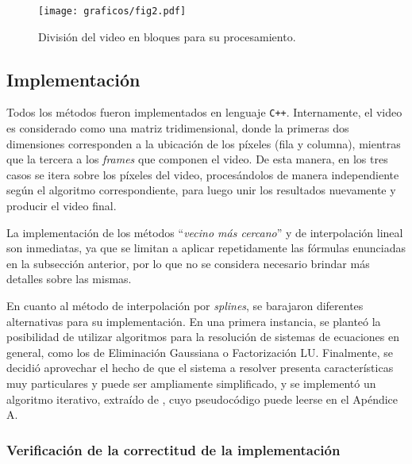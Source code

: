         \begin{figure}[h]
          \centering

          \texttt{[image: graficos/fig2.pdf]} \vspace{1em} \\

          \caption{División del video en bloques para su procesamiento.}
          \label{fig:spline-bloques}
        \end{figure}


  \subsection{Implementación}

    Todos los métodos fueron implementados en lenguaje \texttt{C++}. Internamente, el video es considerado como una matriz tridimensional, donde la primeras dos dimensiones corresponden a la ubicación de los píxeles (fila y columna), mientras que la tercera a los \emph{frames} que componen el video. De esta manera, en los tres casos se itera sobre los píxeles del video, procesándolos de manera independiente según el algoritmo correspondiente, para luego unir los resultados nuevamente y producir el video final.

    La implementación de los métodos ``\emph{vecino más cercano}'' y de interpolación lineal son inmediatas, ya que se limitan a aplicar repetidamente las fórmulas enunciadas en la subsección anterior, por lo que no se considera necesario brindar más detalles sobre las mismas.

    En cuanto al método de interpolación por \emph{splines}, se barajaron diferentes alternativas para su implementación. En una primera instancia, se planteó la posibilidad de utilizar algoritmos para la resolución de sistemas de ecuaciones en general, como los de Eliminación Gaussiana o Factorización LU. Finalmente, se decidió aprovechar el hecho de que el sistema a resolver presenta características muy particulares y puede ser ampliamente simplificado, y se implementó un algoritmo iterativo, extraído de \cite[Algoritmo 3.4]{Burden}, cuyo pseudocódigo puede leerse en el Apéndice A.

    \subsubsection{Verificación de la correctitud de la implementación}

